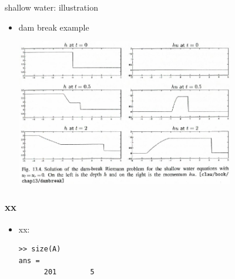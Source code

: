 \documentclass[10pt,hyperref]{beamer}
\begin{document}
\begin{frame}{shallow water: illustration}

\begin{itemize}
\item dam break example

\hfill \includegraphics[width=0.75\textwidth]{figs/leveque13p4}

\end{itemize}
\end{frame}


\begin{frame}[fragile]
\frametitle{xx}

\begin{itemize}
\item xx:

\medskip
\begin{Verbatim}[fontsize=\scriptsize]
>> size(A)
ans =
      201        5
\end{Verbatim}

\end{itemize}
\end{frame}
\end{document}
